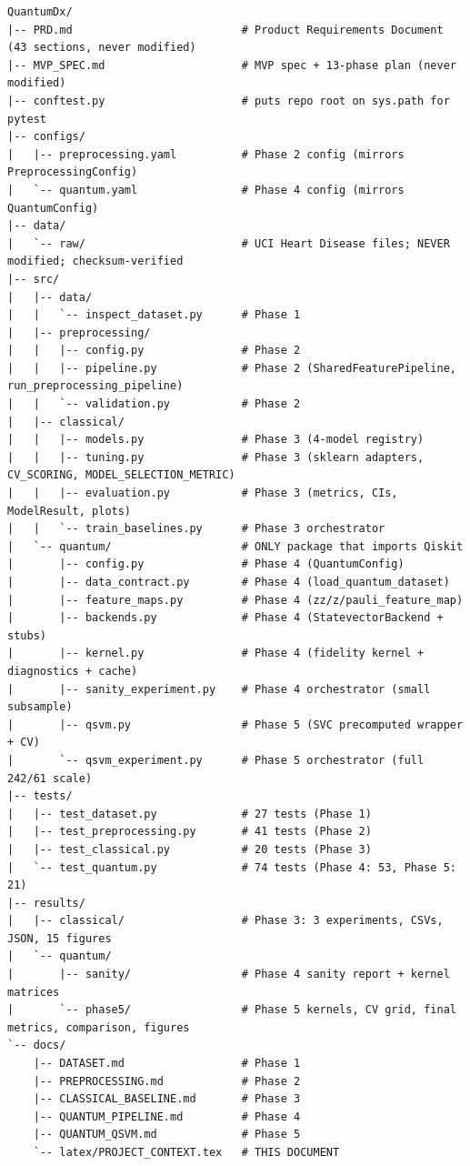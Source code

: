 \documentclass[11pt,a4paper]{article}
\begin{document}
\begin{lstlisting}
QuantumDx/
|-- PRD.md                          # Product Requirements Document (43 sections, never modified)
|-- MVP_SPEC.md                     # MVP spec + 13-phase plan (never modified)
|-- conftest.py                     # puts repo root on sys.path for pytest
|-- configs/
|   |-- preprocessing.yaml          # Phase 2 config (mirrors PreprocessingConfig)
|   `-- quantum.yaml                # Phase 4 config (mirrors QuantumConfig)
|-- data/
|   `-- raw/                        # UCI Heart Disease files; NEVER modified; checksum-verified
|-- src/
|   |-- data/
|   |   `-- inspect_dataset.py      # Phase 1
|   |-- preprocessing/
|   |   |-- config.py               # Phase 2
|   |   |-- pipeline.py             # Phase 2 (SharedFeaturePipeline, run_preprocessing_pipeline)
|   |   `-- validation.py           # Phase 2
|   |-- classical/
|   |   |-- models.py               # Phase 3 (4-model registry)
|   |   |-- tuning.py               # Phase 3 (sklearn adapters, CV_SCORING, MODEL_SELECTION_METRIC)
|   |   |-- evaluation.py           # Phase 3 (metrics, CIs, ModelResult, plots)
|   |   `-- train_baselines.py      # Phase 3 orchestrator
|   `-- quantum/                    # ONLY package that imports Qiskit
|       |-- config.py               # Phase 4 (QuantumConfig)
|       |-- data_contract.py        # Phase 4 (load_quantum_dataset)
|       |-- feature_maps.py         # Phase 4 (zz/z/pauli_feature_map)
|       |-- backends.py             # Phase 4 (StatevectorBackend + stubs)
|       |-- kernel.py               # Phase 4 (fidelity kernel + diagnostics + cache)
|       |-- sanity_experiment.py    # Phase 4 orchestrator (small subsample)
|       |-- qsvm.py                 # Phase 5 (SVC precomputed wrapper + CV)
|       `-- qsvm_experiment.py      # Phase 5 orchestrator (full 242/61 scale)
|-- tests/
|   |-- test_dataset.py             # 27 tests (Phase 1)
|   |-- test_preprocessing.py       # 41 tests (Phase 2)
|   |-- test_classical.py           # 20 tests (Phase 3)
|   `-- test_quantum.py             # 74 tests (Phase 4: 53, Phase 5: 21)
|-- results/
|   |-- classical/                  # Phase 3: 3 experiments, CSVs, JSON, 15 figures
|   `-- quantum/
|       |-- sanity/                 # Phase 4 sanity report + kernel matrices
|       `-- phase5/                 # Phase 5 kernels, CV grid, final metrics, comparison, figures
`-- docs/
    |-- DATASET.md                  # Phase 1
    |-- PREPROCESSING.md            # Phase 2
    |-- CLASSICAL_BASELINE.md       # Phase 3
    |-- QUANTUM_PIPELINE.md         # Phase 4
    |-- QUANTUM_QSVM.md             # Phase 5
    `-- latex/PROJECT_CONTEXT.tex   # THIS DOCUMENT
\end{lstlisting}
\end{document}
